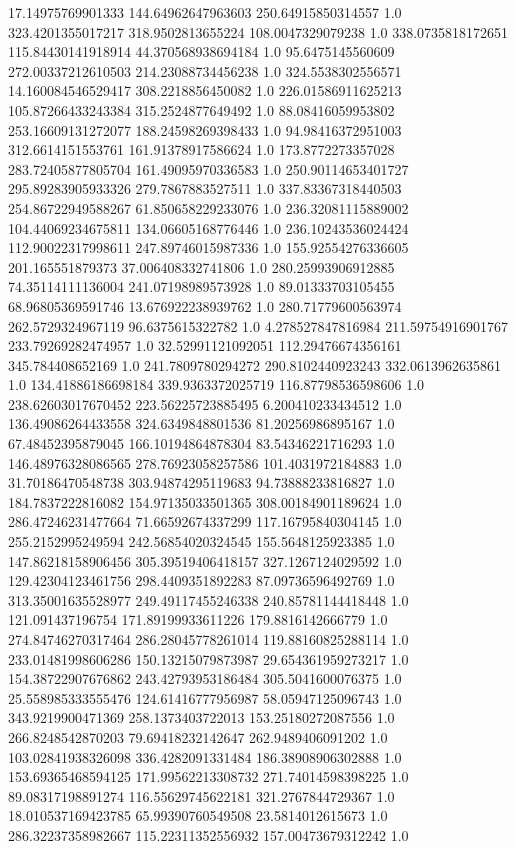 17.14975769901333	144.64962647963603	250.64915850314557	1.0
323.4201355017217	318.9502813655224	108.0047329079238	1.0
338.0735818172651	115.84430141918914	44.370568938694184	1.0
95.6475145560609	272.00337212610503	214.23088734456238	1.0
324.5538302556571	14.160084546529417	308.2218856450082	1.0
226.01586911625213	105.87266433243384	315.2524877649492	1.0
88.08416059953802	253.16609131272077	188.24598269398433	1.0
94.98416372951003	312.6614151553761	161.91378917586624	1.0
173.8772273357028	283.72405877805704	161.49095970336583	1.0
250.90114653401727	295.89283905933326	279.7867883527511	1.0
337.83367318440503	254.86722949588267	61.850658229233076	1.0
236.32081115889002	104.44069234675811	134.06605168776446	1.0
236.10243536024424	112.90022317998611	247.89746015987336	1.0
155.92554276336605	201.165551879373	37.006408332741806	1.0
280.25993906912885	74.35114111136004	241.07198989573928	1.0
89.01333703105455	68.96805369591746	13.676922238939762	1.0
280.71779600563974	262.5729324967119	96.6375615322782	1.0
4.278527847816984	211.59754916901767	233.79269282474957	1.0
32.52991121092051	112.29476674356161	345.784408652169	1.0
241.7809780294272	290.8102440923243	332.0613962635861	1.0
134.41886186698184	339.9363372025719	116.87798536598606	1.0
238.62603017670452	223.56225723885495	6.200410233434512	1.0
136.49086264433558	324.6349848801536	81.20256986895167	1.0
67.48452395879045	166.10194864878304	83.54346221716293	1.0
146.48976328086565	278.76923058257586	101.4031972184883	1.0
31.70186470548738	303.94874295119683	94.73888233816827	1.0
184.7837222816082	154.97135033501365	308.00184901189624	1.0
286.47246231477664	71.66592674337299	117.16795840304145	1.0
255.2152995249594	242.56854020324545	155.5648125923385	1.0
147.86218158906456	305.39519406418157	327.1267124029592	1.0
129.42304123461756	298.4409351892283	87.09736596492769	1.0
313.35001635528977	249.49117455246338	240.85781144418448	1.0
121.091437196754	171.89199933611226	179.8816142666779	1.0
274.84746270317464	286.28045778261014	119.88160825288114	1.0
233.01481998606286	150.13215079873987	29.654361959273217	1.0
154.38722907676862	243.42793953186484	305.5041600076375	1.0
25.558985333555476	124.61416777956987	58.05947125096743	1.0
343.9219900471369	258.1373403722013	153.25180272087556	1.0
266.8248542870203	79.69418232142647	262.9489406091202	1.0
103.02841938326098	336.4282091331484	186.38908906302888	1.0
153.69365468594125	171.99562213308732	271.74014598398225	1.0
89.08317198891274	116.55629745622181	321.2767844729367	1.0
18.010537169423785	65.99390760549508	23.5814012615673	1.0
286.32237358982667	115.22311352556932	157.00473679312242	1.0
